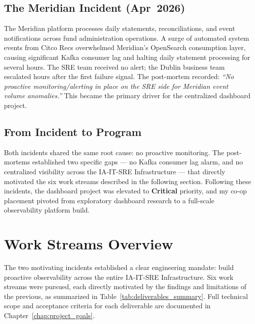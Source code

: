 \subsection{The Meridian Incident (Apr~2026)}

The Meridian platform processes daily statements, reconciliations, and
event notifications across fund administration operations. A surge of
automated system events from Citco Recs overwhelmed
Meridian's OpenSearch consumption layer, causing significant Kafka consumer lag
and halting daily statement processing for several hours. The SRE team received no alert; the
Dublin business team escalated hours after the
first failure signal. The post-mortem recorded: \textit{``No proactive
monitoring/alerting in place on the SRE side for Meridian event volume
anomalies.''} This became the primary driver for the centralized dashboard project.

\subsection{From Incident to Program}

Both incidents shared the same root cause: no proactive monitoring. The
post-mortems established two specific gaps --- no Kafka consumer lag alarm,
and no centralized visibility across the IA-IT-SRE Infrastructure --- that
directly motivated the six work streams described in the following
section. Following these incidents, the dashboard project was elevated to \textbf{Critical} priority,
and my co-op placement pivoted from exploratory dashboard research
to a full-scale observability platform build.


\FloatBarrier

\section{Work Streams Overview}
\label{sec:project_overview}


The two motivating incidents established a clear engineering mandate: build
proactive observability across the entire IA-IT-SRE Infrastructure. Six
work streams were pursued, each directly motivated by the findings and
limitations of the previous, as summarized in Table~\ref{tab:deliverables_summary}. Full technical scope and acceptance criteria
for each deliverable are documented in Chapter~\ref{chap:project_goals}.

